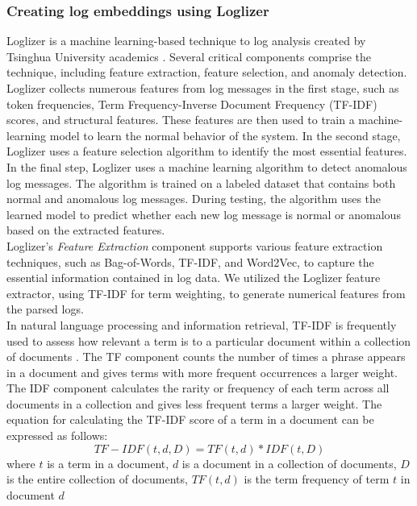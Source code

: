       \subsubsection{Creating log embeddings using Loglizer}
        \label{subsub:Loglizer}
        Loglizer is a machine learning-based technique to log analysis created by Tsinghua University academics \cite{Loglizer}. 
        Several critical components comprise the technique, including feature extraction, feature selection, and anomaly detection.
        Loglizer collects numerous features from log messages in the first stage, such as token frequencies, Term Frequency-Inverse Document Frequency (TF-IDF) scores, 
        and structural features. 
        These features are then used to train a machine-learning model to learn the normal behavior of the system.
        In the second stage, Loglizer uses a feature selection algorithm to identify the most essential features.
        In the final step, Loglizer uses a machine learning algorithm to detect anomalous log messages. 
        The algorithm is trained on a labeled dataset that contains both normal and anomalous log messages. 
        During testing, the algorithm uses the learned model to predict whether each new log message is normal or anomalous based on the extracted features.\\
        Loglizer's \emph{Feature Extraction} component supports various feature extraction techniques, such as Bag-of-Words, TF-IDF, and Word2Vec, 
        to capture the essential information contained in log data. We utilized the Loglizer feature extractor, using TF-IDF \cite{TF-IDF} for term weighting, to generate numerical 
        features from the parsed logs.\\
        In natural language processing and information retrieval, TF-IDF is frequently used to assess how relevant a term is to a particular document within a collection 
        of documents \cite{tf-idf_review}. The TF component counts the number of times a phrase appears in a document and gives terms with more frequent occurrences a larger weight. 
        The IDF component calculates the rarity or frequency of each term across all documents in a collection and gives less frequent terms a larger weight.
        The equation for calculating the TF-IDF score of a term in a document can be expressed as follows:
        \begin{equation}
          TF-IDF(t,d,D) = TF(t,d) * IDF(t,D)
        \end{equation}
        where $t$ is a term in a document, $d$ is a document in a collection of documents, $D$ is the entire collection of documents, $TF(t,d)$ is the term frequency of term $t$ in document $d$
